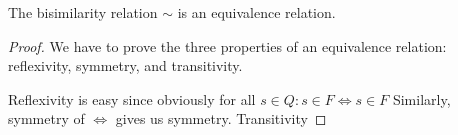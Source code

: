 \begin{theorem}
    The bisimilarity relation $\sim$ is an equivalence relation.
\end{theorem}

\begin{proof}
    We have to prove the three properties of an equivalence relation:
    reflexivity, symmetry, and transitivity.

    Reflexivity is easy since obviously for all $s \in Q: s \in F \iff s \in F$
    Similarly, symmetry of $\iff$ gives us symmetry.
    Transitivity
\end{proof}

%
%
%
%

